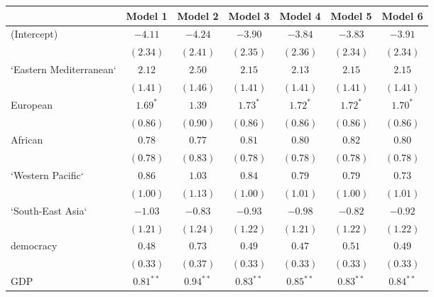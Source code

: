 
\begin{table}[!h]
\begin{center}
\begin{tabular}{l c c c c c c }
\toprule
 & Model 1 & Model 2 & Model 3 & Model 4 & Model 5 & Model 6 \\
\midrule
(Intercept)             & $-4.11$      & $-4.24$      & $-3.90$      & $-3.84$      & $-3.83$      & $-3.91$      \\
                        & $(2.34)$     & $(2.41)$     & $(2.35)$     & $(2.36)$     & $(2.34)$     & $(2.34)$     \\
`Eastern Mediterranean` & $2.12$       & $2.50$       & $2.15$       & $2.13$       & $2.15$       & $2.15$       \\
                        & $(1.41)$     & $(1.46)$     & $(1.41)$     & $(1.41)$     & $(1.41)$     & $(1.41)$     \\
European                & $1.69^{*}$   & $1.39$       & $1.73^{*}$   & $1.72^{*}$   & $1.72^{*}$   & $1.70^{*}$   \\
                        & $(0.86)$     & $(0.90)$     & $(0.86)$     & $(0.86)$     & $(0.86)$     & $(0.86)$     \\
African                 & $0.78$       & $0.77$       & $0.81$       & $0.80$       & $0.82$       & $0.80$       \\
                        & $(0.78)$     & $(0.83)$     & $(0.78)$     & $(0.78)$     & $(0.78)$     & $(0.78)$     \\
`Western Pacific`       & $0.86$       & $1.03$       & $0.84$       & $0.79$       & $0.79$       & $0.73$       \\
                        & $(1.00)$     & $(1.13)$     & $(1.00)$     & $(1.01)$     & $(1.00)$     & $(1.01)$     \\
`South-East Asia`       & $-1.03$      & $-0.83$      & $-0.93$      & $-0.98$      & $-0.82$      & $-0.92$      \\
                        & $(1.21)$     & $(1.24)$     & $(1.22)$     & $(1.21)$     & $(1.22)$     & $(1.22)$     \\
democracy               & $0.48$       & $0.73$       & $0.49$       & $0.47$       & $0.51$       & $0.49$       \\
                        & $(0.33)$     & $(0.37)$     & $(0.33)$     & $(0.33)$     & $(0.33)$     & $(0.33)$     \\
GDP                     & $0.81^{**}$  & $0.94^{**}$  & $0.83^{**}$  & $0.85^{**}$  & $0.83^{**}$  & $0.84^{**}$  \\

\end{tabular}
\end{center}
\end{table}
